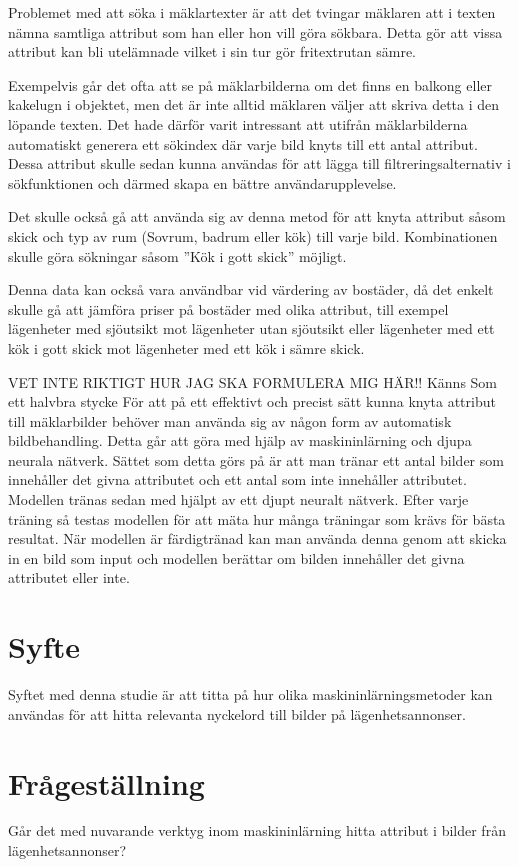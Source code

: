 \documentclass[]{kththesis}
\begin{document}
Problemet med att söka i mäklartexter är att det tvingar mäklaren att i texten nämna samtliga attribut som han eller hon vill göra sökbara. 
Detta gör att vissa attribut kan bli utelämnade vilket i sin tur gör fritextrutan sämre.

Exempelvis går det ofta att se på mäklarbilderna om det finns en balkong eller kakelugn i objektet, men det är inte alltid mäklaren väljer att skriva detta i den löpande texten.
Det hade därför varit intressant att utifrån mäklarbilderna automatiskt generera ett sökindex där varje bild knyts till ett antal attribut.
Dessa attribut skulle sedan kunna användas för att lägga till filtreringsalternativ i sökfunktionen och därmed skapa en bättre användarupplevelse.

Det skulle också gå att använda sig av denna metod för att knyta attribut såsom skick och typ av rum (Sovrum, badrum eller kök) till varje bild.
Kombinationen skulle göra sökningar såsom ”Kök i gott skick” möjligt.  

Denna data kan också vara användbar vid värdering av bostäder, då det enkelt skulle gå att jämföra priser på bostäder med olika attribut, till exempel lägenheter med sjöutsikt mot lägenheter utan sjöutsikt eller lägenheter med ett kök i gott skick mot lägenheter med ett kök i sämre skick.

VET INTE RIKTIGT HUR JAG SKA FORMULERA MIG HÄR!! Känns Som ett halvbra stycke
För att på ett effektivt och precist sätt kunna knyta attribut till mäklarbilder behöver man använda sig av någon form av automatisk bildbehandling.
Detta går att göra med hjälp av maskininlärning och djupa neurala nätverk.
Sättet som detta görs på är att man tränar ett antal bilder som innehåller det givna attributet och ett antal som inte innehåller attributet.
Modellen tränas sedan med hjälpt av ett djupt neuralt nätverk. 
Efter varje träning så testas modellen för att mäta hur många träningar som krävs för bästa resultat.
När modellen är färdigtränad kan man använda denna genom att skicka in en bild som input och modellen berättar om bilden innehåller det givna attributet eller inte.

\section{Syfte}
Syftet med denna studie är att titta på hur olika maskininlärningsmetoder kan användas för att hitta relevanta nyckelord till bilder på lägenhetsannonser. 

\section{Frågeställning}
Går det med nuvarande verktyg inom maskininlärning hitta attribut i bilder från lägenhetsannonser?
\end{document}
